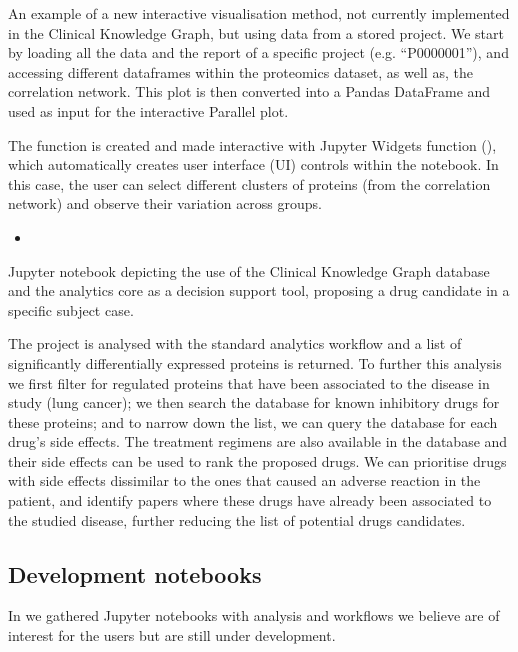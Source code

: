 \documentclass[letterpaper,10pt,english]{sphinxmanual}
\begin{document}
An example of a new interactive visualisation method, not currently implemented in the Clinical Knowledge Graph, but using data from a stored project. We start by loading all the data and the report of a specific project (e.g. “P0000001”), and accessing different dataframes within the proteomics dataset, as well as, the correlation network. This plot is then converted into a Pandas DataFrame and used as input for the interactive Parallel plot.

The function is created and made interactive with Jupyter Widgets  function (), which automatically creates user interface (UI) controls within the notebook. In this case, the user can select different clusters of proteins (from the correlation network) and observe their variation across groups.
\begin{itemize}
\item {} 

\end{itemize}

Jupyter notebook depicting the use of the Clinical Knowledge Graph database and the analytics core as a decision support tool, proposing a drug candidate in a specific subject case.

The project is analysed with the standard analytics workflow and a list of significantly differentially expressed proteins is returned. To further this analysis we first filter for regulated proteins that have been associated to the disease in study (lung cancer); we then search the database for known inhibitory drugs for these proteins; and to narrow down the list, we can query the database for each drug’s side effects. The treatment regimens are also available in the database and their side effects can be used to rank the proposed drugs. We can prioritise drugs with side effects dissimilar to the ones that caused an adverse reaction in the patient, and identify papers where these drugs have already been associated to the studied disease, further reducing the list of potential drugs candidates.


\subsection{Development notebooks}
\label{\detokenize{advanced_features/ckg-notebooks:development-notebooks}}
In  we gathered Jupyter notebooks with analysis and workflows we believe are of interest for the users but are still under development.
\end{document}

